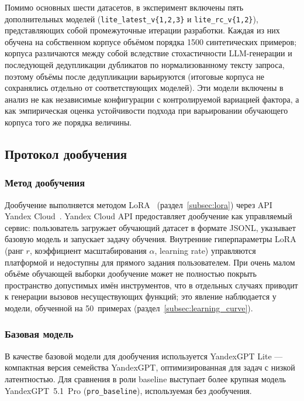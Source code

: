 Помимо основных шести датасетов, в эксперимент включены пять дополнительных моделей (\texttt{lite\_latest\_v\{1,2,3\}} и \texttt{lite\_rc\_v\{1,2\}}), представляющих собой промежуточные итерации разработки. Каждая из них обучена на собственном корпусе объёмом порядка 1500 синтетических примеров; корпуса различаются между собой вследствие стохастичности LLM-генерации и последующей дедупликации дубликатов по нормализованному тексту запроса, поэтому объёмы после дедупликации варьируются (итоговые корпуса не сохранялись отдельно от соответствующих моделей). Эти модели включены в анализ не как независимые конфигурации с контролируемой вариацией фактора, а как эмпирическая оценка устойчивости подхода при варьировании обучающего корпуса того же порядка величины.

\subsection{Протокол дообучения} \label{subsec:training}

\subsubsection{Метод дообучения}

Дообучение выполняется методом LoRA~\cite{hu2022lora} (раздел~\ref{subsec:lora}) через API Yandex Cloud~\cite{yandexgpt2024docs}. Yandex Cloud API предоставляет дообучение как управляемый сервис: пользователь загружает обучающий датасет в формате JSONL, указывает базовую модель и запускает задачу обучения. Внутренние гиперпараметры LoRA (ранг $r$, коэффициент масштабирования $\alpha$, learning rate) управляются платформой и недоступны для прямого задания пользователем. При очень малом объёме обучающей выборки дообучение может не полностью покрыть пространство допустимых имён инструментов, что в отдельных случаях приводит к генерации вызовов несуществующих функций; это явление наблюдается у модели, обученной на 50~примерах (раздел~\ref{subsec:learning_curve}).

\subsubsection{Базовая модель}

В качестве базовой модели для дообучения используется YandexGPT Lite --- компактная версия семейства YandexGPT, оптимизированная для задач с низкой латентностью. Для сравнения в роли baseline выступает более крупная модель YandexGPT~5.1~Pro (\texttt{pro\_baseline}), используемая без дообучения.

